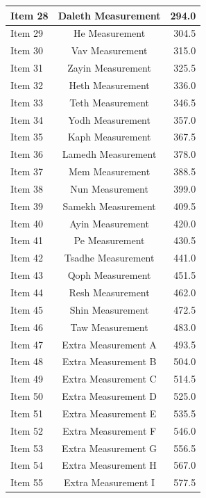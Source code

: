 \documentclass{article}
\begin{document}
\begin{longtable}{|l|c|r|}
Item 28 & Daleth Measurement & 294.0 \\ \hline
Item 29 & He Measurement & 304.5 \\ \hline
Item 30 & Vav Measurement & 315.0 \\ \hline
Item 31 & Zayin Measurement & 325.5 \\ \hline
Item 32 & Heth Measurement & 336.0 \\ \hline
Item 33 & Teth Measurement & 346.5 \\ \hline
Item 34 & Yodh Measurement & 357.0 \\ \hline
Item 35 & Kaph Measurement & 367.5 \\ \hline
Item 36 & Lamedh Measurement & 378.0 \\ \hline
Item 37 & Mem Measurement & 388.5 \\ \hline
Item 38 & Nun Measurement & 399.0 \\ \hline
Item 39 & Samekh Measurement & 409.5 \\ \hline
Item 40 & Ayin Measurement & 420.0 \\ \hline
Item 41 & Pe Measurement & 430.5 \\ \hline
Item 42 & Tsadhe Measurement & 441.0 \\ \hline
Item 43 & Qoph Measurement & 451.5 \\ \hline
Item 44 & Resh Measurement & 462.0 \\ \hline
Item 45 & Shin Measurement & 472.5 \\ \hline
Item 46 & Taw Measurement & 483.0 \\ \hline
Item 47 & Extra Measurement A & 493.5 \\ \hline
Item 48 & Extra Measurement B & 504.0 \\ \hline
Item 49 & Extra Measurement C & 514.5 \\ \hline
Item 50 & Extra Measurement D & 525.0 \\ \hline
Item 51 & Extra Measurement E & 535.5 \\ \hline
Item 52 & Extra Measurement F & 546.0 \\ \hline
Item 53 & Extra Measurement G & 556.5 \\ \hline
Item 54 & Extra Measurement H & 567.0 \\ \hline
Item 55 & Extra Measurement I & 577.5 \\ \hline
\end{longtable}
\end{document}
